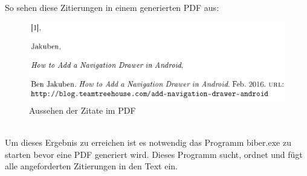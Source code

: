\documentclass[FIPLY_base.tex]{subfiles}
\begin{document}
\ \\
So sehen diese Zitierungen in einem generierten PDF aus:
\begin{figure}[H]
	\includegraphics[scale=0.5]{img/Citations}
	\caption{Aussehen der Zitate im PDF}
\end{figure}
\ \\
Um dieses Ergebnis zu erreichen ist es notwendig das Programm biber.exe zu starten bevor eine PDF generiert wird.
Dieses Programm sucht, ordnet und fügt alle angeforderten Zitierungen in den Text ein.


%
%
%
\end{document}
